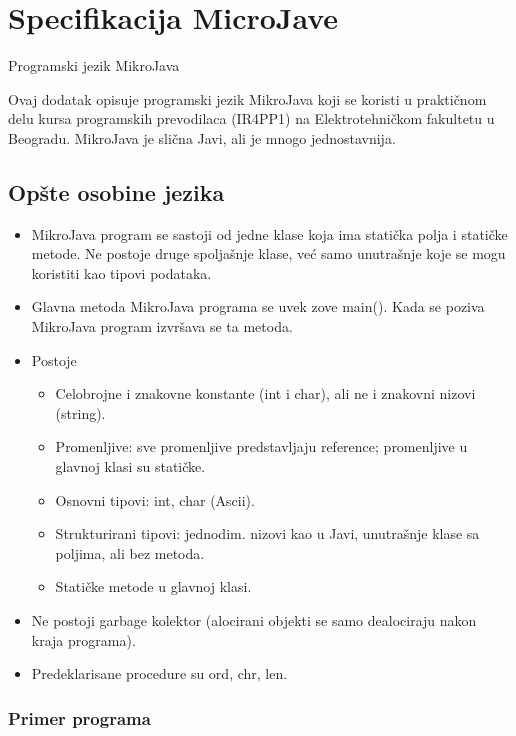 
\appendix

\chapter{Specifikacija MicroJave}
\label{ch:microjava-spec}

Programski jezik MikroJava 
 
Ovaj dodatak opisuje programski jezik MikroJava koji se koristi u praktičnom delu kursa programskih 
prevodilaca (IR4PP1) na Elektrotehničkom fakultetu u Beogradu. MikroJava je slična Javi, ali je mnogo 
jednostavnija. 
 
 
\section{Opšte osobine jezika}
\begin{itemize}
\item MikroJava program se sastoji od jedne klase koja ima statička polja i statičke metode. Ne postoje druge 
spoljašnje klase, već samo unutrašnje koje se mogu koristiti kao tipovi podataka. 
\item Glavna metoda MikroJava programa se uvek zove main(). Kada se poziva MikroJava program 
izvršava se ta metoda. 
\item Postoje
\begin{itemize}
\item Celobrojne i znakovne konstante (int i char), ali ne i znakovni nizovi (string). 
\item Promenljive: sve promenljive predstavljaju reference; promenljive u glavnoj klasi su statičke. 
\item Osnovni tipovi: int, char (Ascii). 
\item Strukturirani tipovi: jednodim. nizovi kao u Javi, unutrašnje klase sa poljima, ali bez metoda. 
\item Statičke metode u glavnoj klasi. 
\end{itemize}
\item Ne postoji garbage kolektor (alocirani objekti se samo dealociraju nakon kraja programa). 
\item Predeklarisane procedure su ord, chr, len. 
 
\end{itemize}
 
 
 
\subsection*{Primer programa}


